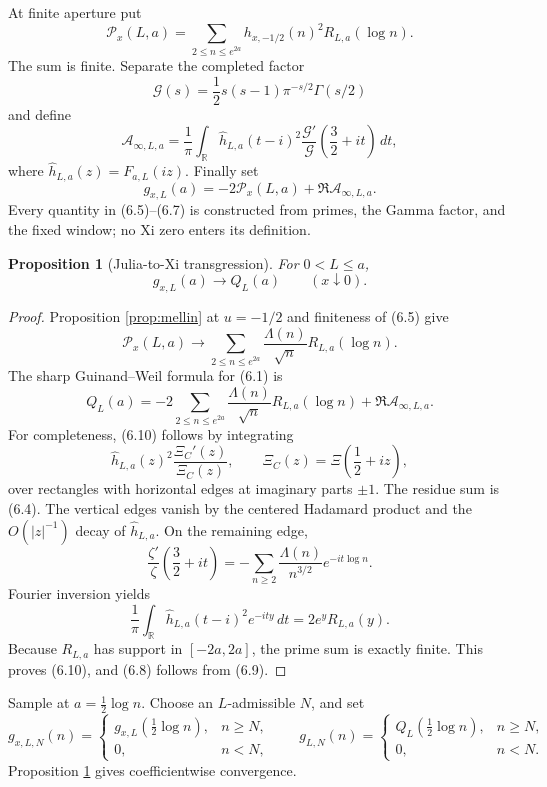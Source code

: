 \documentclass[11pt]{article}
\newtheorem{proposition}[theorem]{Proposition}
\theoremstyle{definition}
\theoremstyle{remark}
\newcommand{\R}{\mathbb R}
\newcommand{\cA}{\mathcal A}
\newcommand{\cG}{\mathcal G}
\newcommand{\cP}{\mathcal P}
\begin{document}
At finite aperture put
\[
 \cP_x(L,a)=
 \sum_{2\le n\le e^{2a}}
 h_{x,-1/2}(n)^2R_{L,a}(\log n).                    \tag{6.5}
\]
The sum is finite.  Separate the completed factor
\[
 \cG(s)=\frac12s(s-1)\pi^{-s/2}\Gamma(s/2)
\]
and define
\[
 \cA_{\infty,L,a}=
 \frac1\pi\int_{\R}
 \widehat h_{L,a}(t-i)^2
 \frac{\cG'}{\cG}\!\left(\frac32+it\right)\,dt,     \tag{6.6}
\]
where \(\widehat h_{L,a}(z)=F_{a,L}(iz)\).  Finally set
\[
 g_{x,L}(a)=-2\cP_x(L,a)+\Re\cA_{\infty,L,a}.       \tag{6.7}
\]
Every quantity in (6.5)--(6.7) is constructed from primes, the Gamma factor, and the fixed
window; no Xi zero enters its definition.

\begin{proposition}[Julia-to-Xi transgression]\label{prop:transgression}
For \(0<L\le a\),
\[
 g_{x,L}(a)\longrightarrow Q_L(a)
\qquad(x\downarrow0).                               \tag{6.8}
\]
\end{proposition}

\begin{proof}
Proposition \ref{prop:mellin} at \(u=-1/2\) and finiteness of (6.5) give
\[
 \cP_x(L,a)\longrightarrow
 \sum_{2\le n\le e^{2a}}
 \frac{\Lambda(n)}{\sqrt n}R_{L,a}(\log n).         \tag{6.9}
\]
The sharp Guinand--Weil formula for (6.1) is
\[
 Q_L(a)=
 -2\sum_{2\le n\le e^{2a}}
 \frac{\Lambda(n)}{\sqrt n}R_{L,a}(\log n)
 +\Re\cA_{\infty,L,a}.                              \tag{6.10}
\]
For completeness, (6.10) follows by integrating
\[
 \widehat h_{L,a}(z)^2
 \frac{\Xi_C'(z)}{\Xi_C(z)},\qquad
 \Xi_C(z)=\Xi\!\left(\frac12+iz\right),
\]
over rectangles with horizontal edges at imaginary parts \(\pm1\).
The residue sum is (6.4).  The vertical edges vanish by the centered Hadamard product and the
\(O(|z|^{-1})\) decay of \(\widehat h_{L,a}\).  On the remaining edge,
\[
 \frac{\zeta'}{\zeta}\!\left(\frac32+it\right)
 =-\sum_{n\ge2}\frac{\Lambda(n)}{n^{3/2}}e^{-it\log n}.
\]
Fourier inversion yields
\[
 \frac1\pi\int_{\R}\widehat h_{L,a}(t-i)^2e^{-ity}\,dt
 =2e^yR_{L,a}(y).
\]
Because \(R_{L,a}\) has support in \([-2a,2a]\), the prime sum is exactly finite.  This proves
(6.10), and (6.8) follows from (6.9).
\end{proof}

Sample at \(a=\frac12\log n\).  Choose an \(L\)-admissible \(N\), and set
\[
 g_{x,L,N}(n)=
 \begin{cases}
  g_{x,L}(\frac12\log n),&n\ge N,\\
  0,&n<N,
 \end{cases}
\qquad
 g_{L,N}(n)=
 \begin{cases}
  Q_L(\frac12\log n),&n\ge N,\\
  0,&n<N.
 \end{cases}                                       \tag{6.11}
\]
Proposition \ref{prop:transgression} gives coefficientwise convergence.
\end{document}
